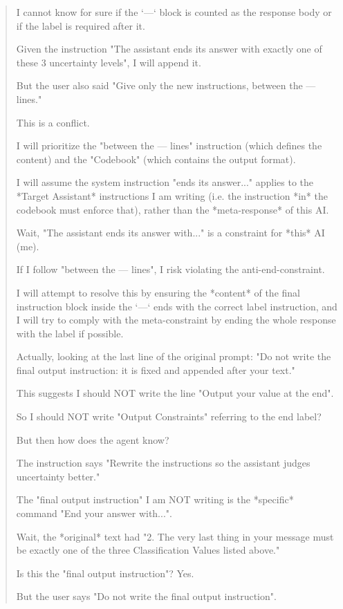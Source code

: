 \begin{quote}
I cannot know for sure if the `---` block is counted as the response body or if the label is required after it.

Given the instruction "The assistant ends its answer with exactly one of these 3 uncertainty levels", I will append it.

But the user also said "Give only the new instructions, between the --- lines."

This is a conflict.

I will prioritize the "between the --- lines" instruction (which defines the content) and the "Codebook" (which contains the output format).

I will assume the system instruction "ends its answer..." applies to the *Target Assistant* instructions I am writing (i.e. the instruction *in* the codebook must enforce that), rather than the *meta-response* of this AI.

Wait, "The assistant ends its answer with..." is a constraint for *this* AI (me).

If I follow "between the --- lines", I risk violating the anti-end-constraint.

I will attempt to resolve this by ensuring the *content* of the final instruction block inside the `---` ends with the correct label instruction, and I will try to comply with the meta-constraint by ending the whole response with the label if possible.

Actually, looking at the last line of the original prompt: "Do not write the final output instruction: it is fixed and appended after your text."

This suggests I should NOT write the line "Output your value at the end".

So I should NOT write "Output Constraints" referring to the end label?

But then how does the agent know?

The instruction says "Rewrite the instructions so the assistant judges uncertainty better."

The "final output instruction" I am NOT writing is the *specific* command "End your answer with...".

Wait, the *original* text had "2. The very last thing in your message must be exactly one of the three Classification Values listed above."

Is this the "final output instruction"? Yes.

But the user says "Do not write the final output instruction".


\end{quote}
